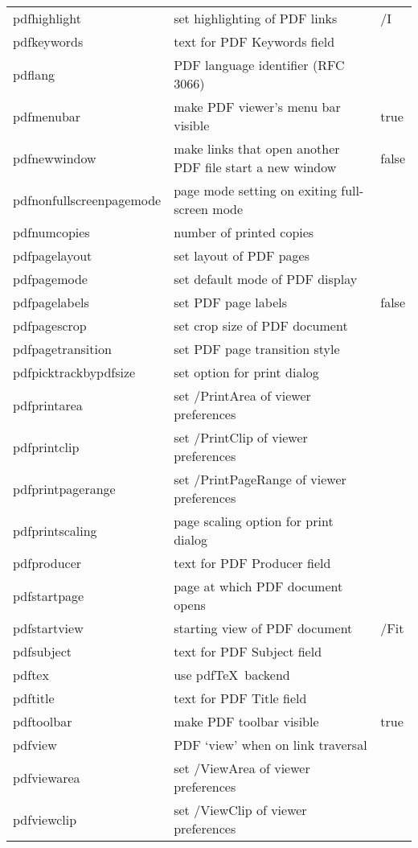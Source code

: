 \documentclass[a4paper,11pt]{article}
\newcommand{\optempty}{{\rmfamily\textit{empty}}}
\begin{document}
\begin{longtable}{@{}>{\ttfamily}lp{70mm}>{\ttfamily}l@{}}
pdfhighlight &set highlighting of PDF links& /I\\
pdfkeywords &text for PDF Keywords field&\optempty\\
pdflang &PDF language identifier (RFC 3066)&\optempty\\
pdfmenubar &make PDF  viewer's menu bar visible&true\\
pdfnewwindow &make links that open another PDF file start a new window&false\\
pdfnonfullscreenpagemode &page mode setting on exiting full-screen mode&\optempty\\
pdfnumcopies &number of printed copies&\optempty\\
pdfpagelayout &set layout of PDF pages&\optempty\\
pdfpagemode &set default mode of PDF display&\optempty\\
pdfpagelabels &set PDF page labels&false\\
pdfpagescrop &set crop size of PDF document&\optempty\\
pdfpagetransition &set PDF page transition style&\optempty\\
pdfpicktrackbypdfsize &set option for print dialog&\optempty\\
pdfprintarea &set /PrintArea of viewer preferences&\optempty\\
pdfprintclip &set /PrintClip of viewer preferences&\optempty\\
pdfprintpagerange &set /PrintPageRange of viewer preferences&\optempty\\
pdfprintscaling &page scaling option for print dialog&\optempty\\
pdfproducer &text for PDF Producer field&\optempty\\
pdfstartpage &page at which PDF document opens&1\\
pdfstartview &starting view of PDF document& /Fit\\
pdfsubject &text for PDF Subject field&\optempty\\
pdftex &use pdf\TeX\ backend\\
pdftitle &text for PDF Title field&\optempty\\
pdftoolbar &make PDF toolbar visible&true\\
pdfview &PDF `view' when on link traversal&\optempty\\
pdfviewarea &set /ViewArea of viewer preferences&\optempty\\
pdfviewclip &set /ViewClip of viewer preferences&\optempty\\

\end{longtable}
\end{document}
